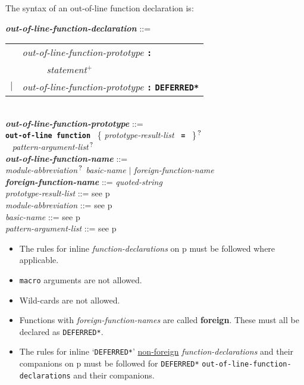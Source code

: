 \documentclass[12pt]{article}
\newcommand{\TT}[1]{{\tt \bfseries #1}}
\newcommand{\PLUS}[1][]{{$^{+#1}$}}
\newcommand{\QMARK}{{$^{\,\mbox{\footnotesize ?}}$}}
\newcommand{\key}[1]{{\rm \bfseries #1}}
\newcommand{\ttkey}[1]{{\tt \bfseries #1}}
\newcommand{\emkey}[1]{{\em \bfseries #1}}
\newcommand{\pagref}[1]{p\pageref{#1}}
\newenvironment{indpar}[1][0.3in]%
	{\begin{list}{}%
		     {\setlength{\itemsep}{0in}%
		      \setlength{\topsep}{0in}%
		      \setlength{\parsep}{1ex}%
		      \setlength{\labelwidth}{#1}%
		      \setlength{\leftmargin}{#1}%
		      \addtolength{\leftmargin}{\labelsep}}%
	 \item}%
	{\end{list}}
\begin{document}
The syntax of an out-of-line function declaration is:

\begin{indpar}
\emkey{out-of-line-function-declaration}%
	\label{OUT-OF-LINE-FUNCTION-DECLARATION} ::= \\
\hspace*{0.5in}
    \begin{tabular}[t]{rl}
        &  {\em out-of-line-function-prototype} \TT{:} \\
	& \TT{~~~~~}{\em statement}\PLUS{} \\
    $|$ &  {\em out-of-line-function-prototype} \TT{:} \ttkey{*DEFERRED*} \\
    \end{tabular}
\\[2ex]
\emkey{out-of-line-function-prototype}%
	\label{OUT-OF-LINE-FUNCTION-PROTOTYPE} ::= \\
\hspace*{0.25in} \ttkey{out-of-line function}~
          \{ {\em prototype-result-list}~ \TT{=}~ \}\QMARK{} \\
\hspace*{0.5in}{\em out-of-line-function-name}~
	      {\em pattern-argument-list}\QMARK{}
\\[0.5ex]
\emkey{out-of-line-function-name} ::= \\
\hspace*{0.25in}
    {\em module-abbreviation}\QMARK{} {\em basic-name}
    $|$ {\em foreign-function-name}
\\[0.5ex]
\emkey{foreign-function-name}\label{FOREIGN-FUNCTION-NAME}
	::= {\em quoted-string}
\\[0.5ex]
{\em prototype-result-list} ::= see \pagref{PROTOTYPE-RESULT-LIST}
\\[0.5ex]
{\em module-abbreviation} ::= see \pagref{MODULE-ABBREVIATION}
\\[0.5ex]
{\em basic-name} ::= see \pagref{BASIC-NAME}
\\[0.5ex]
{\em pattern-argument-list} ::= see \pagref{PATTERN-ARGUMENT-LIST}

\begin{itemize}
\item
The rules for inline {\em function-declarations} on
\pagref{FUNCTION-DECLARATION} must be followed where applicable.
\item
{\tt macro} arguments are not allowed.
\item
Wild-cards are not allowed.
\item Functions with {\em foreign-function-names} are called \key{foreign}.
These must all be declared as {\tt *DEFERRED*}.
\item
The rules for inline `{\tt *DEFERRED*}' \underline{non-foreign}
{\em function-declarations} and
their companions on \pagref{COMPANION-DECLARATION}
must be followed for
{\tt *DEFERRED*} {\tt out-of-line-function-de\-clar\-ations}
and their companions.
\end{itemize}
\end{indpar}
\end{document}
